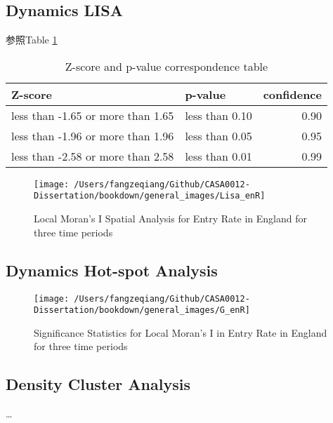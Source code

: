 \documentclass[
  12pt,
  oneside]{book}
\begin{document}
\hypertarget{dynamics-lisa}{%
\subsection{Dynamics LISA}\label{dynamics-lisa}}

参照Table \ref{tab:tab-z-p-corr}

\begin{table}

\caption{\label{tab:tab-z-p-corr}Z-score and p-value correspondence table}
\centering
\begin{tabular}[t]{llr}
\toprule
\textbf{Z-score} & \textbf{p-value} & \textbf{confidence}\\
\midrule
less than -1.65 or more than 1.65 & less than 0.10 & 0.90\\
less than -1.96 or more than 1.96 & less than 0.05 & 0.95\\
less than -2.58 or more than 2.58 & less than 0.01 & 0.99\\
\bottomrule
\end{tabular}
\end{table}

\begin{figure}
\texttt{[image: /Users/fangzeqiang/Github/CASA0012-Dissertation/bookdown/general\_images/Lisa\_enR]} \caption{Local Moran's I Spatial Analysis for Entry Rate in England for three time periods}\label{fig:fig-lisa-entry-rate}
\end{figure}

\hypertarget{dynamics-hot-spot-analysis}{%
\subsection{Dynamics Hot-spot Analysis}\label{dynamics-hot-spot-analysis}}

\begin{figure}
\texttt{[image: /Users/fangzeqiang/Github/CASA0012-Dissertation/bookdown/general\_images/G\_enR]} \caption{Significance Statistics for Local Moran's I in Entry Rate in England for three time periods}\label{fig:fig-Gi-entry-rate}
\end{figure}

\hypertarget{density-cluster-analysis}{%
\subsection{Density Cluster Analysis}\label{density-cluster-analysis}}

\ldots{}
\end{document}
